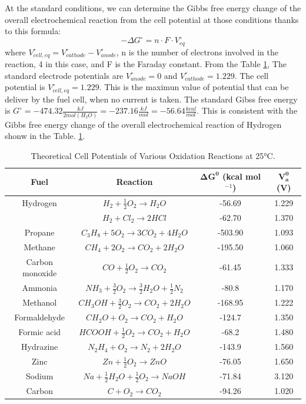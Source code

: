 At the standard conditions, we can determine the Gibbs free energy change of the overall electrochemical reaction from the cell potential at those conditions thanks to this formula: 
\begin{equation}
    -\Delta G^{\circ} = n \cdot F \cdot V^{\circ}_{eq}
\end{equation} 
where $V^{\circ}_{cell,eq} = V^{\circ}_{cathode} - V^{\circ}_{anode}$, n is the number of electrons involved in the reaction, 4 in this case, and F is the Faraday constant. 
From the Table \ref{tab:cell_potentials}, The standard electrode potentials are $V^{\circ}_{anode} = 0$ and $V^{\circ}_{cathode} = 1.229$. The cell potential is $V^{\circ}_{cell,eq} = 1.229$. This is the maximun value of potential that can be deliver by the fuel cell, when no current is taken. The standard Gibss free energy is $G^{\circ} = - 474.32 \frac{kJ}{2 mol(H_2O)} = -237.16 \frac{kJ}{mol} = -56.64 \frac{kcal}{mol}$. This is consistent with the Gibbs free energy change of the overall electrochemical reaction of Hydrogen shonw in the Table. \ref{tab:cell_potentials}. 
\begin{table}[H]
\centering
\caption{Theoretical Cell Potentials of Various Oxidation Reactions at 25°C.}
\begin{tabular}{|c|c|c|c|}
\hline
\textbf{Fuel} & \textbf{Reaction} & $\mathbf{\Delta G^0}$ (kcal mol$^{-1}$) & $\mathbf{V_a^0}$ (V) \\ \hline
Hydrogen & $H_2 + \frac{1}{2}O_2 \rightarrow H_2O$ & -56.69 & 1.229 \\ \hline
         & $H_2 + Cl_2 \rightarrow 2HCl$ & -62.70 & 1.370 \\ \hline
Propane  & $C_3H_8 + 5O_2 \rightarrow 3CO_2 + 4H_2O$ & -503.90 & 1.093 \\ \hline
Methane  & $CH_4 + 2O_2 \rightarrow CO_2 + 2H_2O$ & -195.50 & 1.060 \\ \hline
Carbon monoxide & $CO + \frac{1}{2}O_2 \rightarrow CO_2$ & -61.45 & 1.333 \\ \hline
Ammonia  & $NH_3 + \frac{3}{2}O_2 \rightarrow \frac{3}{2}H_2O + \frac{1}{2}N_2$ & -80.8 & 1.170 \\ \hline
Methanol & $CH_3OH + \frac{3}{2}O_2 \rightarrow CO_2 + 2H_2O$ & -168.95 & 1.222 \\ \hline
Formaldehyde & $CH_2O + O_2 \rightarrow CO_2 + H_2O$ & -124.7 & 1.350 \\ \hline
Formic acid & $HCOOH + \frac{1}{2}O_2 \rightarrow CO_2 + H_2O$ & -68.2 & 1.480 \\ \hline
Hydrazine & $N_2H_4 + O_2 \rightarrow N_2 + 2H_2O$ & -143.9 & 1.560 \\ \hline
Zinc      & $Zn + \frac{1}{2}O_2 \rightarrow ZnO$ & -76.05 & 1.650 \\ \hline
Sodium    & $Na + \frac{1}{2}H_2O + \frac{1}{2}O_2 \rightarrow NaOH$ & -71.84 & 3.120 \\ \hline
Carbon    & $C + O_2 \rightarrow CO_2$ & -94.26 & 1.020 \\ \hline
\end{tabular}
\label{tab:cell_potentials}
\end{table}
  

